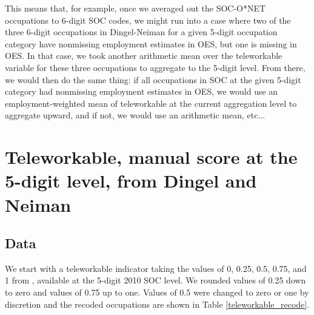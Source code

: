\documentclass{article}
\begin{document}
This means that, for example, once we averaged out the SOC-O*NET occupations to 6-digit SOC codes, we might run into a case where two of the three 6-digit occupations in Dingel-Neiman for a given 5-digit occupation category have nonmissing employment estimates in OES, but one is missing in OES. In that case, we took another arithmetic mean over the teleworkable variable for these three occupations to aggregate to the 5-digit level. From there, we would then do the same thing: if all occupations in SOC at the given 5-digit category had nonmissing employment estimates in OES, we would use an employment-weighted mean of teleworkable at the current aggregation level to aggregate upward, and if not, we would use an arithmetic mean, etc...

\section{Teleworkable, manual score at the 5-digit level, from Dingel and Neiman}

\subsection{Data}
We start with a teleworkable indicator taking the values of 0, 0.25, 0.5, 0.75, and 1 from \cite{DN}, available at the 5-digit 2010 SOC level. We rounded values of 0.25 down to zero and values of 0.75 up to one. Values of 0.5 were changed to zero or one by discretion and the recoded occupations are shown in Table \ref{teleworkable_recode}.





\end{document}
